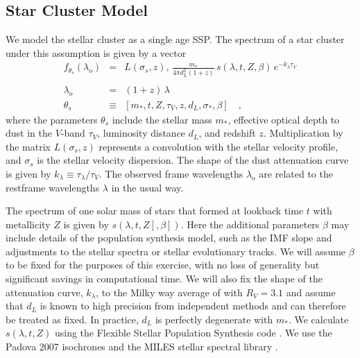 \documentclass[iop,numberedappendix]{emulateapj}
\begin{document}
\subsection{Star Cluster Model}
\label{sec:cluster_model}
We model the stellar cluster as a single age SSP. The spectrum of a
star cluster under this assumption is given by a vector
\begin{eqnarray} \label{eq:StarModel}\displaystyle
f_{\theta_s}(\lambda_o) & = &
L(\sigma_s, z) ,\, \frac{m_*}{4\pi d_L^2(1+z)} \, s(\lambda, t, Z , \beta) \, e^ {-k_\lambda\tau_V} \\
\nonumber \\ 
\lambda_o & = & (1+z)\,\lambda 
\\
\theta_s & \equiv & \left[ m_*, t, Z, \tau_V, z, d_L, \sigma_*, \beta \right]
\quad ,
\end{eqnarray} where the
parameters $\theta_s$ include 
the stellar mass $m_*$, 
effective optical depth to dust in the $V$-band $\tau_V$, 
luminosity distance $d_L$,
and redshift $z$.
Multiplication by the matrix $L(\sigma_s, z)$ represents a convolution
with the stellar velocity profile,
and $\sigma_s$ is the stellar velocity dispersion. 
The shape of the dust attenuation curve is given by $k_\lambda \equiv
\tau_\lambda/\tau_V$.  
The observed frame wavelengths $\lambda_o$ are related to the
restframe wavelengths $\lambda$ in the usual way.

The spectrum of one solar mass of stars that formed at lookback time
$t$ with metallicity $Z$ is given by $s(\lambda, t, Z [, \beta])$.
Here the additional parameters $\beta$ may include details of the
population synthesis model, such as the IMF slope and adjustments to
the stellar spectra or stellar evolutionary tracks. We will assume
$\beta$ to be fixed for the purposes of this exercise, with no loss of
generality but significant savings in computational time.  We will
also fix the shape of the attenuation curve, $k_\lambda $, to the
Milky way average of \citet{CCM89} with $R_V=3.1$ and assume that
$d_L$ is known to high precision from independent methods and can
therefore be treated as fixed.  In practice, $d_L$ is perfectly
degenerate with $m_*$. We calculate $s(\lambda, t, Z)$ using the
Flexible Stellar Population Synthesis code \citep[FSPS][]{fsps}.  We
use the Padova 2007 isochrones \citep{girardi00, bertelli94, marigo07}
and the MILES stellar spectral library \citep{miles_I, miles_II,
miles_III}.

\end{document}
